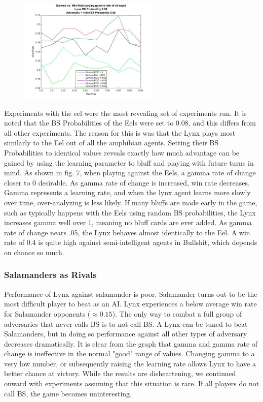 \documentclass[a4paper,11pt]{article}
\begin{document}
\begin{figure}
\includegraphics[width=0.6\textwidth]{lynx_vs_eel_2_gamma}
\caption{}
\end{figure}

Experiments with the eel were the most revealing set of experiments run. It is noted that the BS Probabilities of the Eels were set to 0.08, and this differs from all other experiments. The reason for this is was that the Lynx plays most similarly to the Eel out of all the amphibian agents. Setting their BS Probabilities to identical values reveals exactly how much advantage can be gained by using the learning parameter to bluff and playing with future turns in mind. As shown in fig. 7, when playing against the Eels, a gamma rate of change closer to 0 desirable. As gamma rate of change is increased, win rate decreases. Gamma represents
a learning rate, and when the lynx agent learns more slowly over time, over-analyzing is less likely. If many bluffs are made early in the game, such as typically happens with the Eels using random BS probabilities, the Lynx increases gamma well over 1, meaning no bluff cards are ever added. As gamma rate of change nears .05, the Lynx behaves almost identically to the Eel. A win rate of 0.4 is quite high against semi-intelligent agents in Bullshit, which depends on chance so much.


\subsubsection{Salamanders as Rivals}

Performance of Lynx against salamander is poor. Salamander turns out to be the most difficult player to beat as an AI. Lynx experiences a below average win rate for Salamander opponents ($\approx0.15$). The only way to combat a full group of adversaries that never calls BS is to not call BS. A Lynx can be tuned to beat Salamanders,
but in doing so performance against all other types of adversary decreases dramatically. It is clear from the graph that gamma and gamma rate of change is ineffective in the normal "good" range of values. Changing gamma to a very low number, or subsequently raising the learning rate allows Lynx to have a better chance at victory. While the results are disheartening, we continued onward with experiments assuming that this situation is rare. If all players do not call BS, the game becomes uninteresting.
\end{document}
